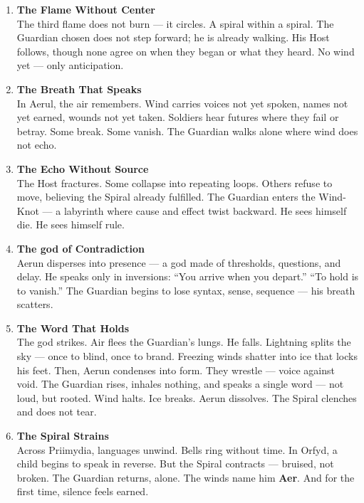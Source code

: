 \documentclass[9pt]{article}
\begin{document}
\begin{center}
\begin{enumerate}
    \item \textbf{The Flame Without Center} \\
    The third flame does not burn — it circles. A spiral within a spiral. The Guardian chosen does not step forward; he is already walking. His Host follows, though none agree on when they began or what they heard. No wind yet — only anticipation.

    \vspace{.3in}
    \item \textbf{The Breath That Speaks} \\
    In Aerul, the air remembers. Wind carries voices not yet spoken, names not yet earned, wounds not yet taken. Soldiers hear futures where they fail or betray. Some break. Some vanish. The Guardian walks alone where wind does not echo.

    \vspace{.3in}
    \item \textbf{The Echo Without Source} \\
    The Host fractures. Some collapse into repeating loops. Others refuse to move, believing the Spiral already fulfilled. The Guardian enters the Wind-Knot — a labyrinth where cause and effect twist backward. He sees himself die. He sees himself rule.

    \vspace{.3in}
    \item \textbf{The god of Contradiction} \\
    Aerun disperses into presence — a god made of thresholds, questions, and delay. He speaks only in inversions: “You arrive when you depart.” “To hold is to vanish.” The Guardian begins to lose syntax, sense, sequence — his breath scatters.

    \vspace{.3in}
    \item \textbf{The Word That Holds} \\
    The god strikes. Air flees the Guardian’s lungs. He falls. Lightning splits the sky — once to blind, once to brand. Freezing winds shatter into ice that locks his feet. Then, Aerun condenses into form. They wrestle — voice against void. The Guardian rises, inhales nothing, and speaks a single word — not loud, but rooted. Wind halts. Ice breaks. Aerun dissolves. The Spiral clenches and does not tear.

    \vspace{.3in}
    \item \textbf{The Spiral Strains} \\
    Across Priimydia, languages unwind. Bells ring without time. In Orfyd, a child begins to speak in reverse. But the Spiral contracts — bruised, not broken. The Guardian returns, alone. The winds name him \textbf{Aer}. And for the first time, silence feels earned.
\end{enumerate}
\end{center}
\end{document}

